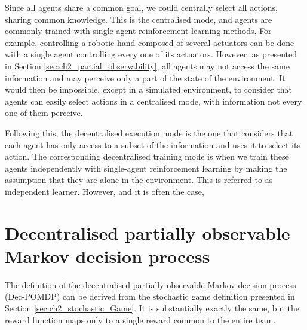 Since all agents share a common goal, we could centrally select all actions, sharing common knowledge.
This is the centralised mode, and agents are commonly trained with single-agent reinforcement learning methods.
For example, controlling a robotic hand composed of several actuators can be done with a single agent controlling every one of its actuators.
However, as presented in Section \ref{sec:ch2_partial_observability}, all agents may not access the same information and may perceive only a part of the state of the environment.
It would then be impossible, except in a simulated environment, to consider that agents can easily select actions in a centralised mode, with information not every one of them perceive.

Following this, the decentralised execution mode is the one that considers that each agent has only access to a subset of the information and uses it to select its action.
The corresponding decentralised training mode is when we train these agents independently with single-agent reinforcement learning by making the assumption that they are alone in the environment.
This is referred to as independent learner.
However, and it is often the case, 


\section{Decentralised partially observable Markov decision process}
\label{sec:ch3_decpomdp}
The definition of the decentralised partially observable Markov decision process (Dec-POMDP) \citep{DecPomdp} can be derived from the stochastic game definition presented in Section \ref{sec:ch2_stochastic_Game}.
It is substantially exactly the same, but the reward function maps only to a single reward common to the entire team.


